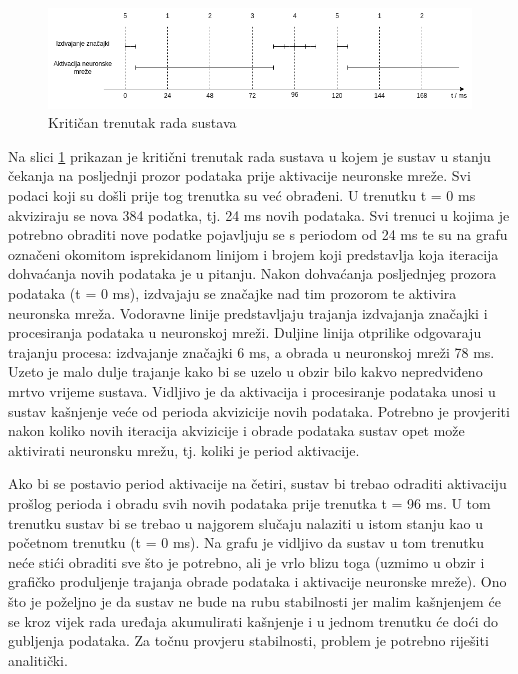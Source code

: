 \begin{figure}[htb]
    \centering
    \includegraphics[width=1\linewidth]{Chapters/implementacija/rts.png} 
    \caption{Kritičan trenutak rada sustava}
    \label{pic:rts}
\end{figure}

Na slici \ref{pic:rts} prikazan je kritični trenutak rada sustava u kojem je sustav 
u stanju čekanja na posljednji prozor podataka prije aktivacije neuronske mreže. Svi
podaci koji su došli prije tog trenutka su već obrađeni. U trenutku t = 0 ms akviziraju se
nova 384 podatka, tj. 24 ms novih podataka. Svi trenuci u kojima je potrebno obraditi nove podatke
pojavljuju se s periodom od 24 ms te su na grafu označeni okomitom isprekidanom linijom i brojem
koji predstavlja koja iteracija dohvaćanja novih podataka je u pitanju. Nakon dohvaćanja
posljednjeg prozora podataka (t = 0 ms), izdvajaju se značajke nad tim prozorom te aktivira neuronska mreža.
Vodoravne linije predstavljaju trajanja
izdvajanja značajki i procesiranja podataka u neuronskoj mreži. Duljine linija otprilike
odgovaraju trajanju procesa: izdvajanje značajki 6 ms, a obrada u neuronskoj mreži 78 ms.
Uzeto je malo dulje trajanje kako bi se uzelo u obzir bilo kakvo nepredviđeno mrtvo vrijeme sustava.
Vidljivo je da aktivacija i procesiranje podataka unosi u sustav kašnjenje veće od perioda
akvizicije novih podataka. Potrebno je provjeriti nakon koliko novih iteracija akvizicije i obrade
podataka sustav opet može aktivirati neuronsku mrežu, tj. koliki je period aktivacije.

Ako bi se postavio period aktivacije na četiri, sustav bi trebao odraditi aktivaciju prošlog
perioda i obradu svih novih podataka prije trenutka t = 96 ms. U tom trenutku sustav bi se trebao
u najgorem slučaju nalaziti u istom stanju kao u početnom trenutku (t = 0 ms). Na grafu
je vidljivo da sustav u tom trenutku neće stići obraditi sve što je potrebno, ali je vrlo blizu
toga (uzmimo u obzir i grafičko produljenje trajanja obrade podataka i aktivacije neuronske mreže). 
Ono što je poželjno je da sustav ne bude na rubu stabilnosti jer malim kašnjenjem će se
kroz vijek rada uređaja akumulirati kašnjenje i u jednom trenutku će doći do gubljenja podataka.
Za točnu provjeru stabilnosti, problem je potrebno riješiti analitički.

